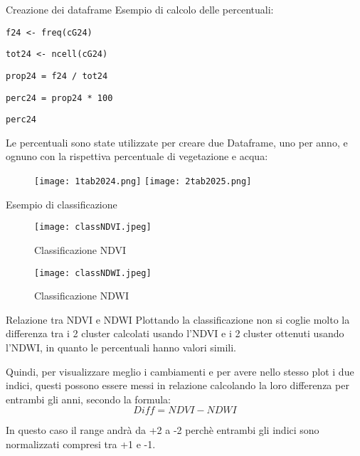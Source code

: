 \documentclass{beamer} %
\begin{document}
\begin{frame}{Creazione dei dataframe}
    Esempio di calcolo delle percentuali:

    \texttt{f24 <- freq(cG24)}

    \texttt{tot24 <- ncell(cG24)}

    \texttt{prop24 = f24 / tot24}

    \texttt{perc24 = prop24 * 100}
    
    \texttt{perc24}
    
    \bigskip Le percentuali sono state utilizzate per creare due Dataframe, uno per anno, e ognuno con la rispettiva percentuale di vegetazione e acqua:

    \begin{figure}
        \centering
        \texttt{[image: 1tab2024.png]}
        \texttt{[image: 2tab2025.png]}
    \end{figure}
\end{frame}

\begin{frame}{Esempio di classificazione}
    \begin{figure}
        \centering
        \texttt{[image: classNDVI.jpeg]}
        \caption{Classificazione NDVI}
        \label{fig:placeholder}
    \end{figure}
    \begin{figure}
        \centering
        \texttt{[image: classNDWI.jpeg]}
        \caption{Classificazione NDWI}
        \label{fig:placeholder}
    \end{figure}
\end{frame}

\begin{frame}{Relazione tra NDVI e NDWI}
    Plottando la classificazione non si coglie molto la differenza tra i 2 cluster calcolati usando l'NDVI e i 2 cluster ottenuti usando l'NDWI, in quanto le percentuali hanno valori simili.

    \bigskip Quindi, per visualizzare meglio i cambiamenti e per avere nello stesso plot i due indici, questi possono essere messi in relazione calcolando la loro differenza per entrambi gli anni, secondo la formula:
    \begin{equation}
        Diff = NDVI - NDWI
    \end{equation}

    \bigskip In questo caso il range andrà da +2 a -2 perchè entrambi gli indici sono normalizzati compresi tra +1 e -1.
\end{frame}
\end{document}
